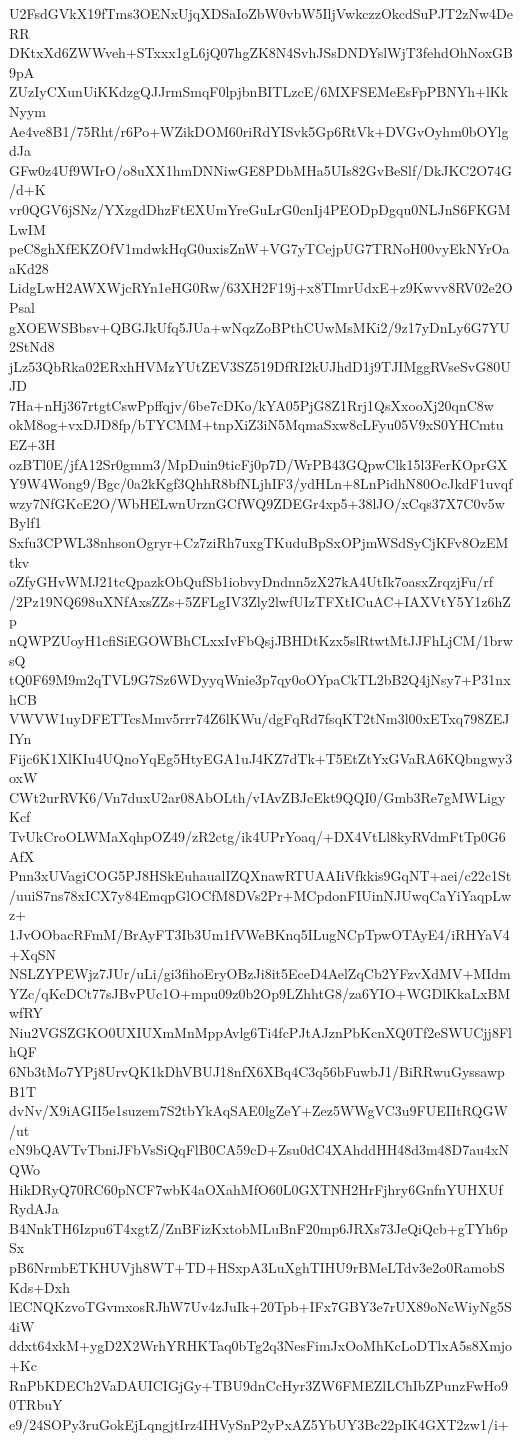 U2FsdGVkX19fTms3OENxUjqXDSaIoZbW0vbW5IljVwkczzOkcdSuPJT2zNw4DeRR
DKtxXd6ZWWveh+STxxx1gL6jQ07hgZK8N4SvhJSsDNDYslWjT3fehdOhNoxGB9pA
ZUzIyCXunUiKKdzgQJJrmSmqF0lpjbnBITLzcE/6MXFSEMeEsFpPBNYh+lKkNyym
Ae4ve8B1/75Rht/r6Po+WZikDOM60riRdYISvk5Gp6RtVk+DVGvOyhm0bOYlgdJa
GFw0z4Uf9WIrO/o8uXX1hmDNNiwGE8PDbMHa5UIs82GvBeSlf/DkJKC2O74G/d+K
vr0QGV6jSNz/YXzgdDhzFtEXUmYreGuLrG0cnIj4PEODpDgqu0NLJnS6FKGMLwIM
peC8ghXfEKZOfV1mdwkHqG0uxisZnW+VG7yTCejpUG7TRNoH00vyEkNYrOaaKd28
LidgLwH2AWXWjcRYn1eHG0Rw/63XH2F19j+x8TImrUdxE+z9Kwvv8RV02e2OPsal
gXOEWSBbsv+QBGJkUfq5JUa+wNqzZoBPthCUwMsMKi2/9z17yDnLy6G7YU2StNd8
jLz53QbRka02ERxhHVMzYUtZEV3SZ519DfRI2kUJhdD1j9TJIMggRVseSvG80UJD
7Ha+nHj367rtgtCswPpffqjv/6be7cDKo/kYA05PjG8Z1Rrj1QsXxooXj20qnC8w
okM8og+vxDJD8fp/bTYCMM+tnpXiZ3iN5MqmaSxw8cLFyu05V9xS0YHCmtuEZ+3H
ozBTl0E/jfA12Sr0gmm3/MpDuin9ticFj0p7D/WrPB43GQpwClk15l3FerKOprGX
Y9W4Wong9/Bgc/0a2kKgf3QhhR8bfNLjhIF3/ydHLn+8LnPidhN80OcJkdF1uvqf
wzy7NfGKcE2O/WbHELwnUrznGCfWQ9ZDEGr4xp5+38lJO/xCqs37X7C0v5wBylf1
Sxfu3CPWL38nhsonOgryr+Cz7ziRh7uxgTKuduBpSxOPjmWSdSyCjKFv8OzEMtkv
oZfyGHvWMJ21tcQpazkObQufSb1iobvyDndnn5zX27kA4UtIk7oasxZrqzjFu/rf
/2Pz19NQ698uXNfAxsZZs+5ZFLgIV3Zly2lwfUIzTFXtICuAC+IAXVtY5Y1z6hZp
nQWPZUoyH1cfiSiEGOWBhCLxxIvFbQsjJBHDtKzx5slRtwtMtJJFhLjCM/1brwsQ
tQ0F69M9m2qTVL9G7Sz6WDyyqWnie3p7qy0oOYpaCkTL2bB2Q4jNsy7+P31nxhCB
VWVW1uyDFETTcsMmv5rrr74Z6lKWu/dgFqRd7fsqKT2tNm3l00xETxq798ZEJIYn
Fijc6K1XlKIu4UQnoYqEg5HtyEGA1uJ4KZ7dTk+T5EtZtYxGVaRA6KQbngwy3oxW
CWt2urRVK6/Vn7duxU2ar08AbOLth/vIAvZBJcEkt9QQI0/Gmb3Re7gMWLigyKcf
TvUkCroOLWMaXqhpOZ49/zR2ctg/ik4UPrYoaq/+DX4VtLl8kyRVdmFtTp0G6AfX
Pnn3xUVagiCOG5PJ8HSkEuhaualIZQXnawRTUAAIiVfkkis9GqNT+aei/c22c1St
/uuiS7ns78xICX7y84EmqpGlOCfM8DVs2Pr+MCpdonFIUinNJUwqCaYiYaqpLwz+
1JvOObacRFmM/BrAyFT3Ib3Um1fVWeBKnq5ILugNCpTpwOTAyE4/iRHYaV4+XqSN
NSLZYPEWjz7JUr/uLi/gi3fihoEryOBzJi8it5EceD4AelZqCb2YFzvXdMV+MIdm
YZc/qKcDCt77sJBvPUc1O+mpu09z0b2Op9LZhhtG8/za6YIO+WGDlKkaLxBMwfRY
Niu2VGSZGKO0UXIUXmMnMppAvlg6Ti4fcPJtAJznPbKcnXQ0Tf2eSWUCjj8FlhQF
6Nb3tMo7YPj8UrvQK1kDhVBUJ18nfX6XBq4C3q56bFuwbJ1/BiRRwuGyssawpB1T
dvNv/X9iAGII5e1suzem7S2tbYkAqSAE0lgZeY+Zez5WWgVC3u9FUEIItRQGW/ut
cN9bQAVTvTbniJFbVsSiQqFlB0CA59cD+Zsu0dC4XAhddHH48d3m48D7au4xNQWo
HikDRyQ70RC60pNCF7wbK4aOXahMfO60L0GXTNH2HrFjhry6GnfnYUHXUfRydAJa
B4NnkTH6Izpu6T4xgtZ/ZnBFizKxtobMLuBnF20mp6JRXs73JeQiQcb+gTYh6pSx
pB6NrmbETKHUVjh8WT+TD+HSxpA3LuXghTIHU9rBMeLTdv3e2o0RamobSKds+Dxh
lECNQKzvoTGvmxosRJhW7Uv4zJuIk+20Tpb+IFx7GBY3e7rUX89oNcWiyNg5S4iW
ddxt64xkM+ygD2X2WrhYRHKTaq0bTg2q3NesFimJxOoMhKcLoDTlxA5s8Xmjo+Kc
RnPbKDECh2VaDAUICIGjGy+TBU9dnCcHyr3ZW6FMEZlLChIbZPunzFwHo90TRbuY
e9/24SOPy3ruGokEjLqngjtIrz4IHVySnP2yPxAZ5YbUY3Bc22pIK4GXT2zw1/i+

